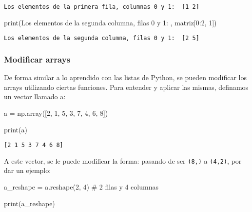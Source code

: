 \documentclass[
  letterpaper,
  DIV=11,
  numbers=noendperiod]{scrreprt}
\newenvironment{Shaded}{\begin{snugshade}}{\end{snugshade}}
\newcommand{\BuiltInTok}[1]{\textcolor[rgb]{0.00,0.23,0.31}{#1}}
\newcommand{\CommentTok}[1]{\textcolor[rgb]{0.37,0.37,0.37}{#1}}
\newcommand{\DecValTok}[1]{\textcolor[rgb]{0.68,0.00,0.00}{#1}}
\newcommand{\NormalTok}[1]{\textcolor[rgb]{0.00,0.23,0.31}{#1}}
\newcommand{\OperatorTok}[1]{\textcolor[rgb]{0.37,0.37,0.37}{#1}}
\newcommand{\StringTok}[1]{\textcolor[rgb]{0.13,0.47,0.30}{#1}}
\begin{document}
\begin{verbatim}
Los elementos de la primera fila, columnas 0 y 1:  [1 2]
\end{verbatim}

\begin{Shaded}
\begin{Highlighting}[]
\BuiltInTok{print}\NormalTok{(}\StringTok{\textquotesingle{}Los elementos de la segunda columna, filas 0 y 1: \textquotesingle{}}\NormalTok{, matriz[}\DecValTok{0}\NormalTok{:}\DecValTok{2}\NormalTok{, }\DecValTok{1}\NormalTok{])}
\end{Highlighting}
\end{Shaded}

\begin{verbatim}
Los elementos de la segunda columna, filas 0 y 1:  [2 5]
\end{verbatim}

\subsubsection{Modificar arrays}\label{modificar-arrays}

De forma similar a lo aprendido con las listas de Python, se pueden
modificar los arrays utilizando ciertas funciones. Para entender y
aplicar las mismas, definamos un vector llamado a:

\begin{Shaded}
\begin{Highlighting}[]
\NormalTok{a }\OperatorTok{=}\NormalTok{ np.array([}\DecValTok{2}\NormalTok{, }\DecValTok{1}\NormalTok{, }\DecValTok{5}\NormalTok{, }\DecValTok{3}\NormalTok{, }\DecValTok{7}\NormalTok{, }\DecValTok{4}\NormalTok{, }\DecValTok{6}\NormalTok{, }\DecValTok{8}\NormalTok{])}

\BuiltInTok{print}\NormalTok{(a)}
\end{Highlighting}
\end{Shaded}

\begin{verbatim}
[2 1 5 3 7 4 6 8]
\end{verbatim}

A este vector, se le puede modificar la forma: pasando de ser
\texttt{(8,)} a \texttt{(4,2)}, por dar un ejemplo:

\begin{Shaded}
\begin{Highlighting}[]
\NormalTok{a\_reshape }\OperatorTok{=}\NormalTok{ a.reshape(}\DecValTok{2}\NormalTok{, }\DecValTok{4}\NormalTok{) }\CommentTok{\# 2 filas y 4 columnas}

\BuiltInTok{print}\NormalTok{(a\_reshape)}
\end{Highlighting}
\end{Shaded}
\end{document}
